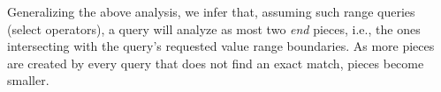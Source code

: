 Generalizing the above analysis, we infer that, assuming such range queries (select operators),
a query will analyze as most two \emph{end} pieces, i.e., the ones intersecting with the query's requested value range boundaries.
As more pieces are created by every query that does not find an exact
match, pieces become smaller.

\begin{figure}[t]
\hspace{6.5em}%
\hfill
\hspace{6.5em}%
\end{figure}


